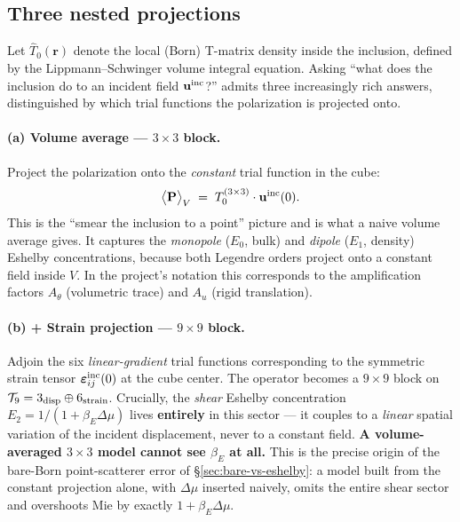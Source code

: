 \documentclass[11pt,a4paper]{article}
\newcommand{\D}{\Delta}
\begin{document}
\subsection{Three nested projections}

Let $\hat{T}_0(\mathbf{r})$ denote the local (Born) T-matrix density
inside the inclusion, defined by the Lippmann--Schwinger volume integral
equation.  Asking ``what does the inclusion do to an incident field
$\mathbf{u}^{\rm inc}$?'' admits three increasingly rich answers,
distinguished by which trial functions the polarization is projected
onto.

\paragraph{(a) Volume average --- $3\times 3$ block.}
Project the polarization onto the \emph{constant} trial function in the
cube:
\begin{equation}
\bigl\langle \mathbf{P}\bigr\rangle_V
  \;=\; T_0^{(3\times 3)} \cdot \mathbf{u}^{\rm inc}(0).
\end{equation}
This is the ``smear the inclusion to a point'' picture and is what a
naive volume average gives.  It captures the \emph{monopole} ($E_0$,
bulk) and \emph{dipole} ($E_1$, density) Eshelby concentrations,
because both Legendre orders project onto a constant field inside $V$.
In the project's notation this corresponds to the amplification factors
$A_\theta$ (volumetric trace) and $A_u$ (rigid translation).

\paragraph{(b) + Strain projection --- $9\times 9$ block.}
Adjoin the six \emph{linear-gradient} trial functions corresponding to
the symmetric strain tensor $\boldsymbol{\varepsilon}^{\rm inc}_{ij}(0)$
at the cube center.  The operator becomes a $9\times 9$ block on
$\mathcal{T}_9 = 3_{\rm disp}\oplus 6_{\rm strain}$.  Crucially, the
\emph{shear} Eshelby concentration $E_2 = 1/(1+\beta_E\D\mu)$ lives
\textbf{entirely} in this sector --- it couples to a \emph{linear}
spatial variation of the incident displacement, never to a constant
field.
\textbf{A volume-averaged $3\times 3$ model cannot see $\beta_E$ at
all.}  This is the precise origin of the bare-Born point-scatterer error
of \S\ref{sec:bare-vs-eshelby}: a model built from the constant
projection alone, with $\D\mu$ inserted naively, omits the entire shear
sector and overshoots Mie by exactly $1+\beta_E\D\mu$.
\end{document}
